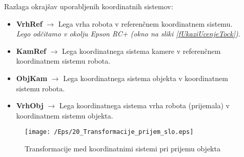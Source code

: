 \vspace*{0.3cm}%
Razlaga okrajšav uporabljenih koordinatnih sistemov:
\vspace*{-0.2cm}%
\begin{itemize}
    \item[] \vspace*{-0.1cm} \textbf{VrhRef} $\longrightarrow$ Lega vrha robota v referenčnem koordinatnem sistemu.\\%
    \hspace*{2.0cm} \emph{Lego odčitamo v okolju Epson RC+ (okno na sliki \ref{fUkaziUcenjeTock})}. %
    \item[] \vspace*{-0.2cm} \textbf{KamRef} $\longrightarrow$ Lega koordinatnega sistema kamere v referenčnem \\ %
    \hspace*{2.15cm} koordinatnem sistemu robota.\\
    \item[] \vspace*{-0.7cm} \textbf{ObjKam} $\longrightarrow$ Lega koordinatnega sistema objekta v koordinatnem \\ %
    \hspace*{2.2cm} sistemu robota.\\
    \item[] \vspace*{-0.7cm} \textbf{VrhObj} $\longrightarrow$ Lega koordinatnega sistema vrha robota (prijemala) v \\ %
    \hspace*{2.2cm} koordinatnem sistemu objekta.\\
\end{itemize}



\begin{figure}[t]
    \center
    \texttt{[image: /Eps/20\_Transformacije\_prijem\_slo.eps]}
    \vspace{-0.3cm}
    \caption{Transformacije med koordinatnimi sistemi pri prijemu objekta}
    \label{fTransformacijaPrijem}
\end{figure}

